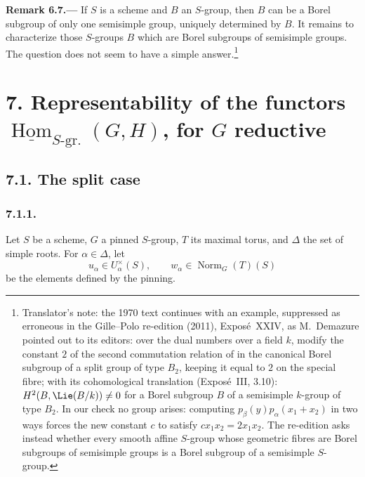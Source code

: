 \par\medskip\noindent{}\textbf{Remark 6.7.---}\enspace
If \(S\) is a scheme and \(B\) an \(S\)-group, then \(B\) can be a
Borel subgroup of only one semisimple group, uniquely determined by
\(B\). It remains to characterize those \(S\)-groups \(B\) which are
Borel subgroups of semisimple
groups. The question does not seem to have a simple answer.\footnote{Translator's note:
the 1970 text continues with an example, suppressed as erroneous in the Gille--Polo re-edition
(2011), Exposé~XXIV, as M.~Demazure pointed out to its editors: over the dual numbers over a
field \(k\), modify the constant \(2\) of the second commutation relation of
 in the canonical Borel subgroup of a split group
of type \(B_2\), keeping it equal to \(2\) on the special fibre; with its cohomological translation
(Exposé~III, 3.10): \(H^2(B,\Lie(B/k))\neq0\) for a Borel subgroup \(B\) of a semisimple \(k\)-group of
type \(B_2\). In our check no group arises: computing \(p_\beta(y)p_\alpha(x_1+x_2)\) in two ways
forces the new constant \(c\) to satisfy \(cx_1x_2=2x_1x_2\). The re-edition asks instead whether
every smooth affine \(S\)-group whose geometric fibres are Borel subgroups of semisimple groups is a
Borel subgroup of a semisimple \(S\)-group.}

\section*{7. Representability of the functors
\(\underline{\operatorname{Hom}}_{S\text{-}\mathrm{gr.}}(G,H)\), for
\(G\) reductive}

\subsection*{7.1. The split case}

\subsubsection*{7.1.1.}

Let \(S\) be a scheme, \(G\) a pinned \(S\)-group, \(T\) its maximal
torus, and \(\Delta\) the set of simple roots. For
\(\alpha\in\Delta\), let
\[
  u_\alpha\in U_\alpha^\times(S),
  \qquad
  w_\alpha\in\operatorname{Norm}_G(T)(S)
\]
be the elements defined by the pinning.

